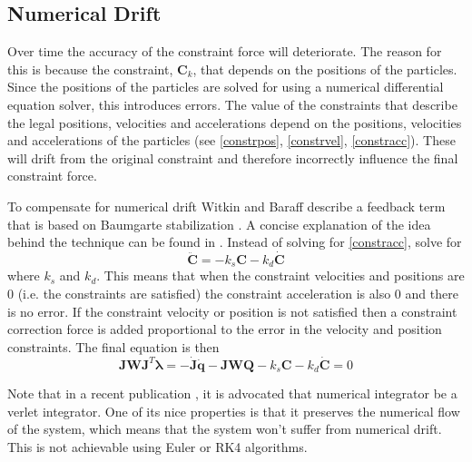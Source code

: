 \subsection{Numerical Drift}
Over time the accuracy of the constraint force will deteriorate. The reason for
this is because the constraint, $\mathbf{C}_k$, that depends on the positions of
the particles. Since the positions of the particles are solved for using a
numerical differential equation solver, this introduces errors. The value of the
constraints that describe the legal positions, velocities and accelerations
depend on the positions, velocities and accelerations of the particles (see
\ref{constrpos}, \ref{constrvel}, \ref{constracc}). These will drift
from the original constraint and therefore incorrectly influence the final
constraint force.   

To compensate for numerical drift Witkin and Baraff describe a feedback term
that is based on Baumgarte stabilization \cite{Baumgarte}. A concise explanation
of the idea behind the technique can be found in \cite{ClinePai}. Instead of
solving for \ref{constracc}, solve for
\[
    \mathbf{\ddot{C}} = -k_s\mathbf{C} - k_d\mathbf{\dot{C}}
\]
where $k_s$ and $k_d$. This means that when the constraint velocities and
positions are 0 (i.e. the constraints are satisfied) the constraint acceleration
is also 0 and there is no error. If the constraint velocity or position is not
satisfied then a constraint correction force is added proportional to the error
in the velocity and position constraints. The final equation is then
\begin{equation}
\label{Eqn:LambdaStable}
\mathbf{JWJ}^T \mathbf{\lambda} = 
    -\mathbf{\dot{J}\dot{q}} -  
    \mathbf{JWQ} -k_s\mathbf{C} - k_d\mathbf{\dot{C}} = 0
\end{equation}

Note that in a recent publication \cite{PracticalDynamics}, it is advocated that
numerical integrator be a verlet integrator. One of its nice properties is that
it preserves the numerical flow of the system, which means that the system won't
suffer from numerical drift. This is not achievable using Euler or RK4
algorithms. 

